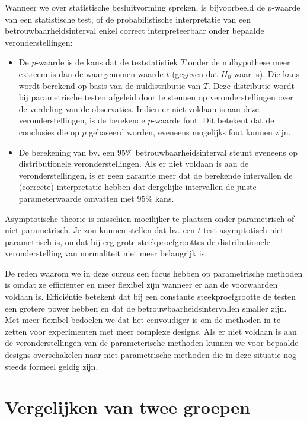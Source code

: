 \documentclass[
  12pt,dutch,coursenotes]{book}
\theoremstyle{definition}
\theoremstyle{definition}
\theoremstyle{definition}
\theoremstyle{definition}
\theoremstyle{remark}
\begin{document}
Wanneer we over statistische besluitvorming spreken, is bijvoorbeeld de \(p\)-waarde van een statistische test, of de probabilistische interpretatie van een betrouwbaarheidsinterval enkel correct interpreteerbaar onder bepaalde veronderstellingen:

\begin{itemize}
\item
  De \(p\)-waarde is de kans dat de teststatistiek \(T\) onder de nulhypothese meer extreem is dan de waargenomen waarde \(t\) (gegeven dat \(H_0\) waar is). Die kans wordt berekend op basis van de nuldistributie van \(T\). Deze distributie wordt bij parametrische testen afgeleid door te steunen op veronderstellingen over de verdeling van de observaties. Indien er niet voldaan is aan deze veronderstellingen, is de berekende \(p\)-waarde fout. Dit betekent dat de conclusies die op \(p\) gebaseerd worden, eveneens mogelijks fout kunnen zijn.
\item
  De berekening van bv. een \(95\%\) betrouwbaarheidsinterval steunt eveneens op distributionele veronderstellingen. Als er niet voldaan is aan de veronderstellingen, is er geen garantie meer dat de berekende intervallen de (correcte) interpretatie hebben dat dergelijke intervallen de juiste parameterwaarde omvatten met \(95\%\) kans.
\end{itemize}

Asymptotische theorie is misschien moeilijker te plaatsen onder parametrisch of niet-parametrisch. Je zou kunnen stellen dat bv. een \(t\)-test asymptotisch niet-parametrisch is, omdat bij erg grote steekproefgroottes de distributionele veronderstelling van normaliteit niet meer belangrijk is.

De reden waarom we in deze cursus een focus hebben op parametrische methoden is omdat ze efficiënter en meer flexibel zijn wanneer er aan de voorwaarden voldaan is. Efficiëntie betekent dat bij een constante steekproefgrootte de testen een grotere power hebben en dat de betrouwbaarheidsintervallen smaller zijn. Met meer flexibel bedoelen we dat het eenvoudiger is om de methoden in te zetten voor experimenten met meer complexe designs.
Als er niet voldaan is aan de veronderstellingen van de parameterische methoden kunnen we voor bepaalde designs overschakelen naar niet-parametrische methoden die in deze situatie nog steeds formeel geldig zijn.

\hypertarget{vergelijken-van-twee-groepen}{%
\section{Vergelijken van twee groepen}\label{vergelijken-van-twee-groepen}}
\end{document}

